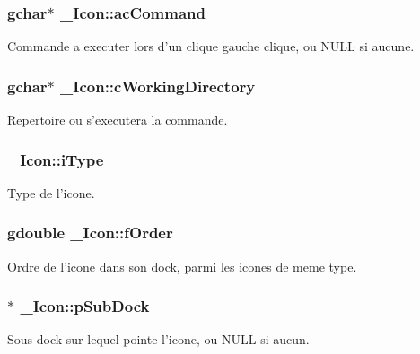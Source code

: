 \subsubsection{\setlength{\rightskip}{0pt plus 5cm}gchar$\ast$ {\bf \_\-Icon::acCommand}}\label{struct__Icon_ea6bb47883982b1378c7b4bdb0d3e9e9}


Commande a executer lors d'un clique gauche clique, ou NULL si aucune. 

\subsubsection{\setlength{\rightskip}{0pt plus 5cm}gchar$\ast$ {\bf \_\-Icon::cWorkingDirectory}}\label{struct__Icon_77995220227d439a25bf786beac51aa6}


Repertoire ou s'executera la commande. 

\subsubsection{ {\bf \_\-Icon::iType}}\label{struct__Icon_9132f1d3d214167300aa91d88fb34fed}


Type de l'icone. 

\subsubsection{\setlength{\rightskip}{0pt plus 5cm}gdouble {\bf \_\-Icon::fOrder}}\label{struct__Icon_0dda24b79deea43680dc5180fa1ac8ac}


Ordre de l'icone dans son dock, parmi les icones de meme type. 

\subsubsection{$\ast$ {\bf \_\-Icon::pSubDock}}\label{struct__Icon_cbc2b0e5614570016c33f6be44e9f866}


Sous-dock sur lequel pointe l'icone, ou NULL si aucun. 


